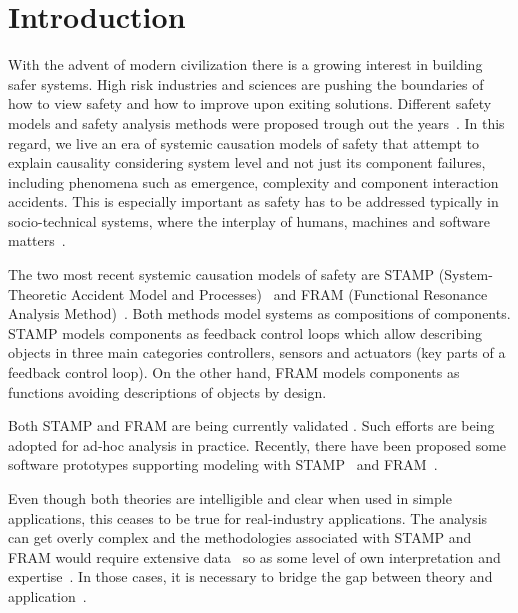 \documentclass[sw]{iosart2x}
\newcommand{\TODO}[1]{{\color{red}{\textbf{TODO: {#1}}\xspace}}}
\begin{document}
\section{Introduction}
\label{sec:intro}
With the advent of modern civilization there is a growing interest in building safer systems. High risk industries and sciences are pushing the boundaries of how to view safety and how to improve upon exiting solutions. Different safety models and safety analysis methods were proposed trough out the years~\cite{ECTL2009}. In this regard, we live an era of systemic causation models of safety that attempt to explain causality considering system level and not just its component failures, including phenomena such as emergence, complexity and component interaction accidents. This is especially important as safety has to be addressed typically in socio-technical systems, where the interplay of humans, machines and software matters~\cite{dekker2017}.

The two most recent systemic causation models of safety are STAMP (System-Theoretic Accident Model and Processes)~\cite{leveson2012engineering} and FRAM (Functional Resonance Analysis Method)~\cite{hollnagel2012fram}. Both methods model systems as compositions of components. STAMP models components as feedback control loops which allow describing objects in three main categories controllers, sensors and actuators (key parts of a feedback control loop). On the other hand, FRAM models components as functions avoiding descriptions of objects by design. 

Both STAMP and FRAM are being currently validated \cite{yaosong2012, Pereira2015, Underwood2016, Allison2017, Zhou2018, Patriarca2017add, FUKUDA2016,Patriarca2018}.
Such efforts are being adopted for ad-hoc analysis in practice. Recently, there have been proposed some software prototypes supporting modeling with STAMP~\cite{Abdulkhaleq2014a, Abdulkhaleq2015, Abdulkhaleq2016} and FRAM~\cite{Rees2016}. 

Even though both theories are intelligible and clear when used in simple applications, this ceases to be true for real-industry applications. The analysis can get overly complex and the methodologies associated with STAMP and FRAM would require extensive data~\cite{Kim2016} so as some level of own interpretation and expertise~\cite{Hollnagel2008}. In those cases, it is necessary to bridge the gap between theory and application~\cite{Underwood2016}. 
\end{document}
